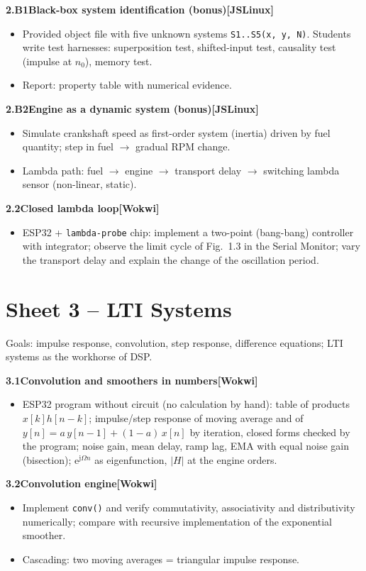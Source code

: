 \documentclass[11pt,a4paper]{article}
\newcommand{\W}{\textsf{\textbf{[Wokwi]}}}
\newcommand{\J}{\textsf{\textbf{[JSLinux]}}}
\newcommand{\exercise}[4]{%
  \par\smallskip\noindent\textbf{#1\quad #2}\hfill#3\par
  \nopagebreak\begin{itemize}[leftmargin=1.2em]#4\end{itemize}}
\begin{document}
\exercise{2.B1}{Black-box system identification (bonus)}{\J}{
  \item Provided object file with five unknown systems
    \texttt{S1..S5(x, y, N)}. Students write test harnesses: superposition
    test, shifted-input test, causality test (impulse at $n_0$), memory
    test.
  \item Report: property table with numerical evidence.}

\exercise{2.B2}{Engine as a dynamic system (bonus)}{\J}{
  \item Simulate crankshaft speed as first-order system (inertia) driven
    by fuel quantity; step in fuel $\rightarrow$ gradual RPM change.
  \item Lambda path: fuel $\rightarrow$ engine $\rightarrow$ transport
    delay $\rightarrow$ switching lambda sensor (non-linear, static).}

\exercise{2.2}{Closed lambda loop}{\W}{
  \item ESP32 + \texttt{lambda-probe} chip: implement a two-point
    (bang-bang) controller with integrator; observe the limit cycle of
    Fig.~1.3 in the Serial Monitor; vary the transport delay and explain
    the change of the oscillation period.}

\section{Sheet 3 -- LTI Systems}
\begin{sheetinfo}
Goals: impulse response, convolution, step response, difference
equations; LTI systems as the workhorse of DSP.
\end{sheetinfo}

\exercise{3.1}{Convolution and smoothers in numbers}{\W}{
  \item ESP32 program without circuit (no calculation by hand): table of
    products $x[k]h[n-k]$; impulse/step response of moving average and of
    $y[n]=a\,y[n-1]+(1-a)\,x[n]$ by iteration, closed forms checked by the
    program; noise gain, mean delay, ramp lag, EMA with equal noise gain
    (bisection); $\mathrm{e}^{\mathrm{j}\Omega n}$ as eigenfunction, $|H|$ at the engine
    orders.}

\exercise{3.2}{Convolution engine}{\W}{
  \item Implement \texttt{conv()} and verify commutativity, associativity
    and distributivity numerically; compare with recursive implementation
    of the exponential smoother.
  \item Cascading: two moving averages = triangular impulse response.}
\end{document}
